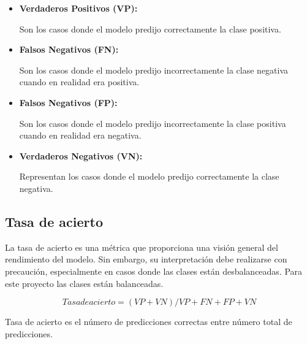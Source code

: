 \begin{itemize}

	\item
	\textbf{Verdaderos Positivos (VP):}
	
	Son los casos donde el modelo predijo correctamente la clase positiva.
	
	\item
	\textbf{Falsos Negativos (FN):}
	
	Son los casos donde el modelo predijo incorrectamente la clase negativa cuando en realidad era positiva.
	
	\item
	\textbf{Falsos Negativos (FP):}
	
	Son los casos donde el modelo predijo incorrectamente la clase positiva cuando en realidad era negativa.
	
	\item
	\textbf{Verdaderos Negativos (VN):}
	
	Representan los casos donde el modelo predijo correctamente la clase negativa.

\end{itemize}


\subsection{Tasa de acierto}

La tasa de acierto es una métrica que proporciona una visión general del rendimiento del modelo. Sin embargo, su interpretación debe realizarse con precaución, especialmente en casos donde las clases están desbalanceadas. Para este proyecto las clases están balanceadas.



	\begin{equation*}
	Tasa de acierto = (VP + VN) / VP + FN + FP + VN
	\end{equation*}
	
	Tasa de acierto es el número de predicciones correctas entre número total de predicciones.
